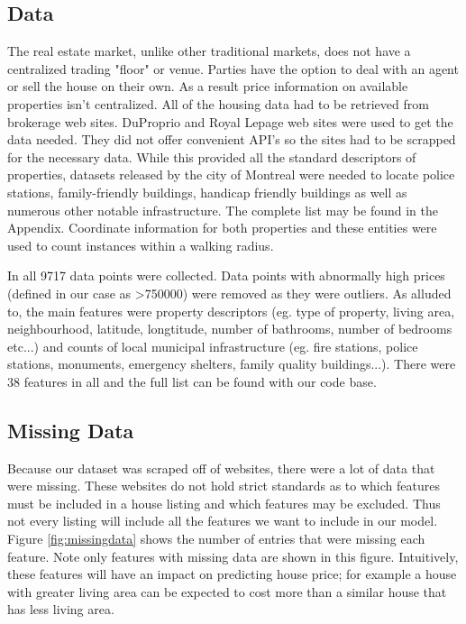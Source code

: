 \documentclass{acm_proc_article-sp}
\begin{document}
\subsection{Data}

	The real estate market, unlike other traditional markets, does not have a centralized trading "floor" or venue. Parties have the option to deal with an agent or sell the house on their own. As a result price information on available properties isn't centralized. All of the housing data had to be retrieved from brokerage web sites. DuProprio and Royal Lepage web sites were used to get the data needed. They did not offer convenient API's so the sites had to be scrapped for the necessary data. While this provided all the standard descriptors of properties, datasets released by the city of Montreal were needed to locate police stations, family-friendly buildings, handicap friendly buildings as well as numerous other notable infrastructure. The complete list may be found in the Appendix. Coordinate information for both properties and these entities were used to count instances within a walking radius.
	
	In all 9717 data points were collected. Data points with abnormally high prices (defined in our case as >750000) were removed as they were outliers. As alluded to, the main features were property descriptors (eg. type of property, living area, neighbourhood, latitude, longtitude, number of bathrooms, number of bedrooms etc...) and counts of local municipal infrastructure (eg. fire stations, police stations, monuments, emergency shelters, family quality buildings...). There were 38 features in all and the full list can be found with our code base.
	
\subsection{Missing Data}

	Because our dataset was scraped off of websites, there were a lot of data that were missing. These websites do not hold strict standards as to which features must be included in a house listing and which features may be excluded. Thus not every listing will include all the features we want to include in our model. Figure \ref{fig:missingdata} shows the number of entries that were missing each feature. Note only features with missing data are shown in this figure. Intuitively, these features will have an impact on predicting house price; for example a house with greater living area can be expected to cost more than a similar house that has less living area. 
	
\end{document}
